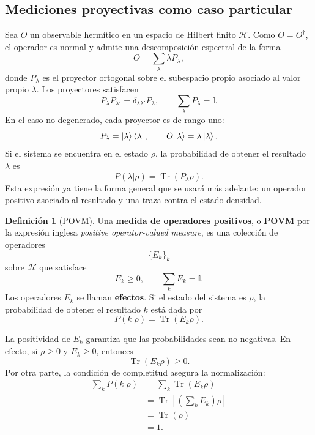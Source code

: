 \documentclass[12pt,a4paper]{article}
\theoremstyle{definition}
\newtheorem{definicion}{Definición}[section]
\theoremstyle{plain}
\theoremstyle{remark}
\newcommand{\Hil}{\mathcal{H}}
\newcommand{\I}{\mathbb{I}}
\begin{document}
\subsection{Mediciones proyectivas como caso particular}

Sea $O$ un observable hermítico en un espacio de Hilbert finito $\Hil$. Como $O=O^\dagger$, el operador es normal y admite una descomposición espectral de la forma
\begin{equation*}
    O=\sum_{\lambda}\lambda P_\lambda,
\end{equation*}
donde $P_\lambda$ es el proyector ortogonal sobre el subespacio propio asociado al valor propio $\lambda$. Los proyectores satisfacen
\begin{equation*}
    P_\lambda P_{\lambda'}=\delta_{\lambda\lambda'}P_\lambda,
    \qquad
    \sum_\lambda P_\lambda=\I.
\end{equation*}
En el caso no degenerado, cada proyector es de rango uno:
\begin{equation*}
    P_\lambda=\ket{\lambda}\bra{\lambda},
    \qquad
    O\ket{\lambda}=\lambda\ket{\lambda}.
\end{equation*}
Si el sistema se encuentra en el estado $\rho$, la probabilidad de obtener el resultado $\lambda$ es
\begin{equation*}
    P(\lambda|\rho)=\operatorname{Tr}(P_\lambda\rho).
\end{equation*}
Esta expresión ya tiene la forma general que se usará más adelante: un operador positivo asociado al resultado y una traza contra el estado densidad.

\begin{definicion}[POVM]
Una \textbf{medida de operadores positivos}, o \textbf{POVM} por la expresión inglesa \emph{positive operator-valued measure}, es una colección de operadores
\begin{equation*}
    \{E_k\}_k
\end{equation*}
sobre $\Hil$ que satisface
\begin{equation*}
    E_k\geq 0,
    \qquad
    \sum_k E_k=\I.
\end{equation*}
Los operadores $E_k$ se llaman \textbf{efectos}. Si el estado del sistema es $\rho$, la probabilidad de obtener el resultado $k$ está dada por
\begin{equation*}
    P(k|\rho)=\operatorname{Tr}(E_k\rho).
\end{equation*}
\end{definicion}

La positividad de $E_k$ garantiza que las probabilidades sean no negativas. En efecto, si $\rho\geq0$ y $E_k\geq0$, entonces
\begin{equation*}
    \operatorname{Tr}(E_k\rho)\geq0.
\end{equation*}
Por otra parte, la condición de completitud asegura la normalización:
\begin{align*}
    \sum_k P(k|\rho)
    &=\sum_k\operatorname{Tr}(E_k\rho)\\
    &=\operatorname{Tr}\left[\left(\sum_kE_k\right)\rho\right]\\
    &=\operatorname{Tr}(\rho)\\
    &=1.
\end{align*}
\end{document}
